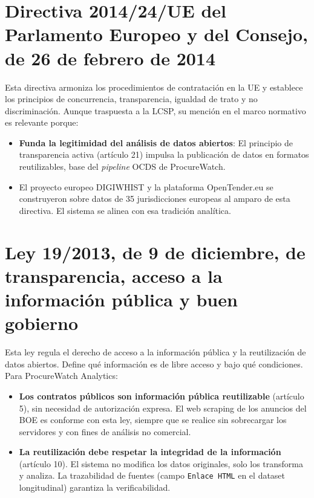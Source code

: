 \documentclass[11pt,a4paper,spanish]{book}
\numberwithin{equation}{chapter}
\numberwithin{figure}{chapter}
\begin{document}
\section{Directiva 2014/24/UE del Parlamento Europeo y del Consejo, de 26 de febrero de 2014}

Esta directiva \cite{Directive2014} armoniza los procedimientos de contratación en la UE y establece los principios de concurrencia, transparencia, igualdad de trato y no discriminación. Aunque traspuesta a la LCSP, su mención en el marco normativo es relevante porque:

\begin{itemize}
\item \textbf{Funda la legitimidad del análisis de datos abiertos}: El principio de transparencia activa (artículo 21) impulsa la publicación de datos en formatos reutilizables, base del \textit{pipeline} OCDS de ProcureWatch.

\item El proyecto europeo DIGIWHIST \cite{Fazekas2020DIGIWHIST} y la plataforma OpenTender.eu se construyeron sobre datos de 35 jurisdicciones europeas al amparo de esta directiva. El sistema se alinea con esa tradición analítica.
\end{itemize}

\section{Ley 19/2013, de 9 de diciembre, de transparencia, acceso a la información pública y buen gobierno}

Esta ley \cite{Ley192013} regula el derecho de acceso a la información pública y la reutilización de datos abiertos. Define qué información es de libre acceso y bajo qué condiciones. Para ProcureWatch Analytics:

\begin{itemize}
\item \textbf{Los contratos públicos son información pública reutilizable} (artículo 5), sin necesidad de autorización expresa. El web scraping de los anuncios del BOE es conforme con esta ley, siempre que se realice sin sobrecargar los servidores y con fines de análisis no comercial.

\item \textbf{La reutilización debe respetar la integridad de la información} (artículo 10). El sistema no modifica los datos originales, solo los transforma y analiza. La trazabilidad de fuentes (campo \texttt{Enlace HTML} en el dataset longitudinal) garantiza la verificabilidad.
\end{itemize}
\end{document}
